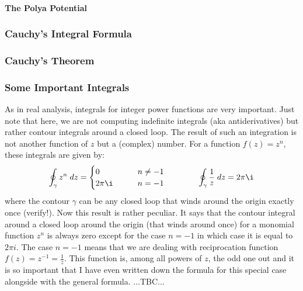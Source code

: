 
\paragraph{The Polya Potential}




\subsubsection{Cauchy's Integral Formula}

\subsubsection{Cauchy's Theorem}

\subsubsection{Some Important Integrals}
As in real analysis, integrals for integer power functions are very important. Just note that here, we are not computing indefinite integrals (aka antiderivatives) but rather contour integrals around a closed loop. The result of such an integration is not another function of $z$ but a (complex) number. For a function $f(z) = z^n$, these integrals are given by:
\begin{equation}
\oint_{\gamma} z^n \; dz = 
\begin{cases}
0        \qquad & n \neq -1 \\
2 \pi \i \qquad & n = -1
\end{cases}
\qquad \qquad
\oint_{\gamma} \frac{1}{z} \; dz = 2 \pi \i
\end{equation}
where the contour $\gamma$ can be any closed loop that winds around the origin exactly once (verify!). Now this result is rather peculiar. It says that the contour integral around a closed loop around the origin (that winds around once) for a monomial function $z^n$ is always zero except for the case $n=-1$ in which case it is equal to $2 \pi i$. The case $n=-1$ means that we are dealing with reciprocation function $f(z) = z^{-1} = \frac{1}{z}$. This function is, among all powers of $z$, the odd one out and it is so important that I have even written down the formula for this special case alongside with the general formula. ...TBC...

